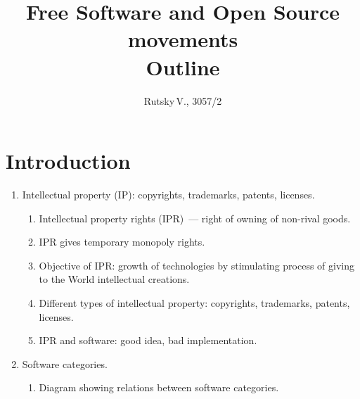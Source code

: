 \documentclass[10pt,a4paper]{article}
\title{Free Software and Open Source movements \\ Outline}
\author{Rutsky\,V., 3057/2}
\newcommand{\bee}{\begin{enumerate}}
\newcommand{\ene}{\end{enumerate}}
\begin{document}
\maketitle


\section{Introduction}
\bee
  \item Intellectual property (IP): copyrights, trademarks, patents, licenses.
  \bee
    \item Intellectual property rights (IPR)~--- right of owning of non-rival goods.
    \item IPR gives temporary monopoly rights.
    \item Objective of IPR: growth of technologies by stimulating process of giving to the World intellectual creations.
    \item Different types of intellectual property: copyrights, trademarks, patents, licenses.
    \item IPR and software: good idea, bad implementation.
  \ene
  \item Software categories.
  \bee
    \item Diagram showing relations between software categories.
  \ene
\ene
\end{document}
